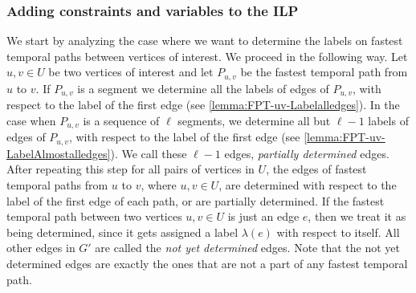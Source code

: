 \documentclass[a4paper,UKenglish,cleveref, autoref, thm-restate]{lipics-v2021}
\begin{document}
\subsubsection{Adding constraints and variables to the ILP}
We start by analyzing the case where we want to determine the labels on fastest temporal paths between vertices of interest.
We proceed in the following way.
Let $u,v \in U$ be two vertices of interest and let $P_{u,v}$ be the fastest temporal path from $u$ to $v$.
If $P_{u,v}$ is a segment we determine all the labels of edges of $P_{u,v}$, with respect to the label of the first edge (see \cref{lemma:FPT-uv-Labelalledges}).
In the case when $P_{u,v}$ is a sequence of $\ell$ segments, we determine all but $\ell - 1$ labels of edges of $P_{u,v}$, with respect to the label of the first edge (see \cref{lemma:FPT-uv-LabelAlmostalledges}).
We call these $\ell - 1$ edges, \emph{partially determined} edges.
After repeating this step for all pairs of vertices in $U$,
the edges of fastest temporal paths from $u$ to $v$, where $u,v \in U$, are determined with respect to the label of the first edge of each path,
or are partially determined.
If the fastest temporal path between two vertices $u,v \in U$ is just an edge $e$, then we treat it as being determined, since it gets assigned a label $\lambda(e)$ with respect to itself.
All other edges in $G'$ %
are called the \emph{not yet determined} edges.
Note that the not yet determined edges are exactly the ones that are not a part of any fastest temporal path.
\end{document}
